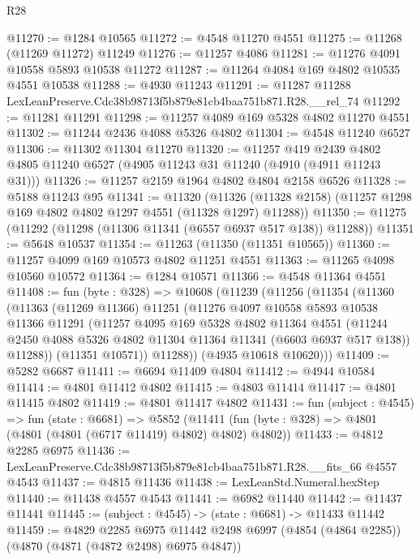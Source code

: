 \begin{lexlean}{R28}
\begin{coremodule}
@11270 := @1284 @10565
@11272 := @4548 @11270 @4551
@11275 := @11268 (@11269 @11272) @11249
@11276 := @11257 @4086
@11281 := @11276 @4091 @10558 @5893 @10538 @11272
@11287 := @11264 @4084 @169 @4802 @10535 @4551 @10538
@11288 := @4930 @11243
@11291 := @11287 @11288 LexLeanPreserve.Cdc38b98713f5b879e81cb4baa751b871.R28.__rel_74
@11292 := @11281 @11291
@11298 := @11257 @4089 @169 @5328 @4802 @11270 @4551
@11302 := @11244 @2436 @4088 @5326 @4802
@11304 := @4548 @11240 @6527
@11306 := @11302 @11304 @11270
@11320 := @11257
    @419
    @2439
    @4802
    @4805
    @11240
    @6527
    (@4905 @11243 @31 @11240 (@4910 (@4911 @11243 @31)))
@11326 := @11257 @2159 @1964 @4802 @4804 @2158 @6526
@11328 := @5188 @11243 @95
@11341 := @11320
    (@11326 (@11328 @2158) (@11257 @1298 @169 @4802 @4802 @1297 @4551 (@11328 @1297) @11288))
@11350 := @11275 (@11292 (@11298 (@11306 @11341 (@6557 @6937 @517 @138)) @11288))
@11351 := @5648 @10537
@11354 := @11263 (@11350 (@11351 @10565))
@11360 := @11257 @4099 @169 @10573 @4802 @11251 @4551
@11363 := @11265 @4098 @10560 @10572
@11364 := @1284 @10571
@11366 := @4548 @11364 @4551
@11408 := fun (byte : @328) =>
  @10608
    (@11239
      (@11256
        (@11354
          (@11360
            (@11363
              (@11269 @11366)
              @11251
              (@11276
                @4097
                @10558
                @5893
                @10538
                @11366
                @11291
                (@11257
                  @4095
                  @169
                  @5328
                  @4802
                  @11364
                  @4551
                  (@11244 @2450 @4088 @5326 @4802 @11304 @11364 @11341 (@6603 @6937 @517 @138))
                  @11288))
              (@11351 @10571))
            @11288))
        (@4935 @10618 @10620)))
@11409 := @5282 @6687
@11411 := @6694 @11409 @4804
@11412 := @4944 @10584
@11414 := @4801 @11412 @4802
@11415 := @4803 @11414
@11417 := @4801 @11415 @4802
@11419 := @4801 @11417 @4802
@11431 := fun (subject : @4545) =>
  fun (state : @6681) =>
  @5852 (@11411 (fun (byte : @328) => @4801 (@4801 (@4801 (@6717 @11419) @4802) @4802) @4802))
@11433 := @4812 @2285 @6975
@11436 := LexLeanPreserve.Cdc38b98713f5b879e81cb4baa751b871.R28.__fits_66 @4557 @4543
@11437 := @4815 @11436
@11438 := LexLeanStd.Numeral.hexStep
@11440 := @11438 @4557 @4543
@11441 := @6982 @11440
@11442 := @11437 @11441
@11445 := (subject : @4545) -> (state : @6681) -> @11433 @11442
@11459 := @4829
    @2285
    @6975
    @11442
    @2498
    @6997
    (@4854 (@4864 @2285))
    (@4870 (@4871 (@4872 @2498) @6975 @4847))

\end{coremodule}
\end{lexlean}
